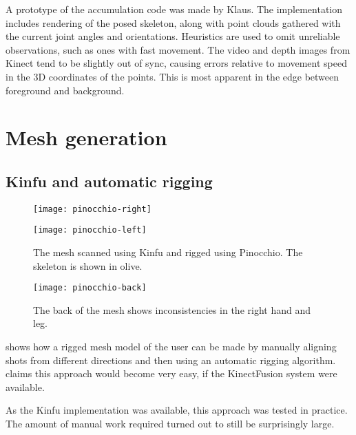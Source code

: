 A prototype of the accumulation code was made by Klaus. The implementation includes rendering of the posed skeleton, along with point clouds gathered with the current joint angles and orientations. Heuristics are used to omit unreliable observations, such as ones with fast movement. The video and depth images from Kinect tend to be slightly out of sync, causing errors relative to movement speed in the 3D coordinates of the points. This is most apparent in the edge between foreground and background.


\section{Mesh generation}


\subsection{Kinfu and automatic rigging} \label{kinfurig}

\begin{figure}
    \centering
    \begin{minipage}{0.49\textwidth}
        \texttt{[image: pinocchio-right]}
    \end{minipage}
    \begin{minipage}{0.49\textwidth}
        \texttt{[image: pinocchio-left]}
    \end{minipage}
    \caption{The mesh scanned using Kinfu and rigged using Pinocchio. The skeleton is shown in olive.}
    \label{fig:hannu-front}
\end{figure}

\begin{figure}
    \centering
    \texttt{[image: pinocchio-back]}
    \caption{The back of the mesh shows inconsistencies in the right hand and leg.}
    \label{fig:hannu-back}
\end{figure}

\citet{charpentier2011accurate} shows how a rigged mesh model of the user can be made by manually aligning shots from different directions and then using an automatic rigging algorithm. \citeauthor{charpentier2011accurate} claims this approach would become very easy, if the KinectFusion system were available.

As the Kinfu implementation was available, this approach was tested in practice. The amount of manual work required turned out to still be surprisingly large.

